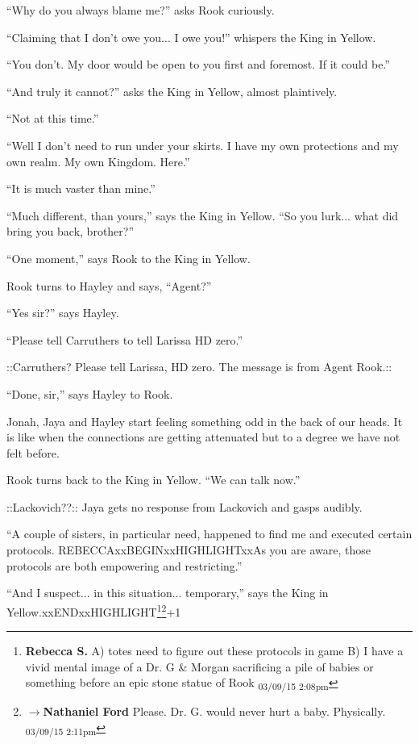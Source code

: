 ``Why do you always blame me?'' asks Rook curiously.

``Claiming that I don't owe you... I owe you!'' whispers the King in Yellow.

``You don't.  My door would be open to you first and foremost.  If it could be.''

``And truly it cannot?'' asks the King in Yellow, almost plaintively.

``Not at this time.''

``Well I don't need to run under your skirts.  I have my own protections and my own realm.  My own Kingdom.  Here.''

``It is much vaster than mine.''

``Much different, than yours,'' says the King in Yellow.  ``So you lurk... what did bring you back, brother?''

``One moment,'' says Rook to the King in Yellow.  



Rook turns to Hayley and says, ``Agent?''

``Yes sir?'' says Hayley.

``Please tell Carruthers to tell Larissa HD zero.''

 {\color[RGB]{255,153,0}::Carruthers?  Please tell Larissa, HD zero.  The message is from Agent Rook.::} 

``Done, sir,'' says Hayley to Rook.

Jonah, Jaya and Hayley start feeling something odd in the back of our heads.  It is like when the connections are getting attenuated but to a degree we have not felt before.



Rook turns back to the King in Yellow. ``We can talk now.''

 {\color[RGB]{255,0,0}::Lackovich??::}   Jaya gets no response from Lackovich and gasps audibly.

``A couple of sisters, in particular need, happened to find me and executed certain protocols.  REBECCAxxBEGINxxHIGHLIGHTxxAs you are aware, those protocols are both empowering and restricting.''

``And I suspect... in this situation... temporary,'' says the King in Yellow.xxENDxxHIGHLIGHT\footnote{\textbf{Rebecca S. }A) totes need to figure out these protocols in game
B) I have a vivid mental image of a Dr. G \& Morgan sacrificing a pile of babies or something before an epic stone statue of Rook \textsubscript{03/09/15 2:08pm}}\footnote{$\rightarrow$\textbf{Nathaniel Ford }Please. Dr. G. would never hurt a baby. Physically. \textsubscript{03/09/15 2:11pm}}+1

